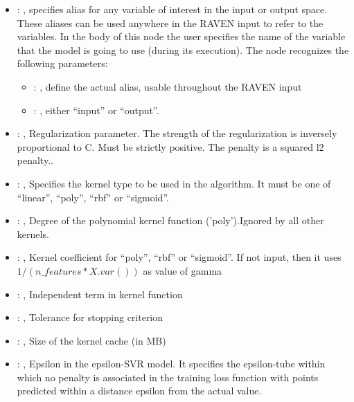 \begin{itemize}
    \item {}: , 
      specifies alias for         any variable of interest in the input or output space. These
      aliases can be used anywhere in the RAVEN input to         refer to the variables. In the body
      of this node the user specifies the name of the variable that the model is going to use
      (during its execution).
      The  node recognizes the following parameters:
        \begin{itemize}
          \item {}: , 
            define the actual alias, usable throughout the RAVEN input
          \item {}: , 
            either ``input'' or ``output''.
      \end{itemize}

    \item {}: , 
      Regularization parameter. The strength of the regularization is inversely
      proportional to C.                                                            Must be strictly
      positive. The penalty is a squared l2 penalty..

    \item {}: , 
      Specifies the kernel type to be used in the algorithm. It must be one of
      ``linear'', ``poly'', ``rbf'' or ``sigmoid''.

    \item {}: , 
      Degree of the polynomial kernel function ('poly').Ignored by all other kernels.

    \item {}: , 
      Kernel coefficient for ``poly'', ``rbf'' or ``sigmoid''. If not input, then it uses
      $1 / (n\_features * X.var())$ as value of gamma

    \item {}: , 
      Independent term in kernel function

    \item {}: , 
      Tolerance for stopping criterion

    \item {}: , 
      Size of the kernel cache (in MB)

    \item {}: , 
      Epsilon in the epsilon-SVR model. It specifies the epsilon-tube
      within which no penalty is associated in the training loss function
      with points predicted within a distance epsilon from the actual
      value.


\end{itemize}
